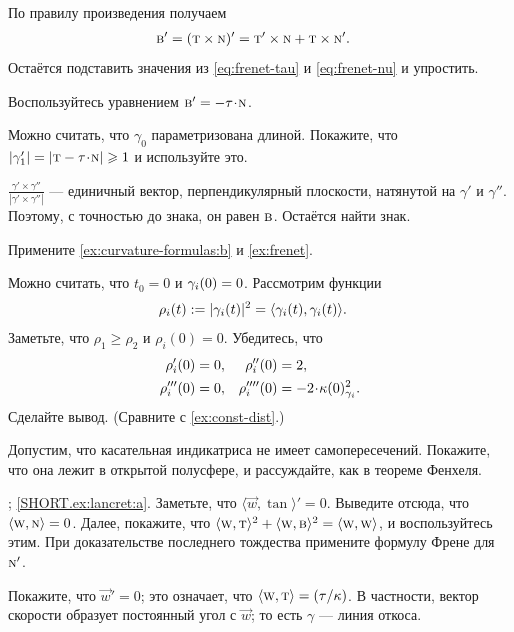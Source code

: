 По правилу произведения получаем
\begin{align*}
\text{\sc{b}}'&=(\text{\sc{t}}\times \text{\sc{n}})'=
\text{\sc{t}}'\times \text{\sc{n}}+\text{\sc{t}}\times\text{\sc{n}}'.
\end{align*}
Остаётся подставить значения из \ref{eq:frenet-tau} и \ref{eq:frenet-nu} и упростить.

Воспользуйтесь уравнением $\bi' = - \tor\cdot \norm $.

Можно считать, что $\gamma_0$ параметризована длиной.
Покажите, что
$|\gamma_1'|=|\tan-\tor\cdot \norm|\ge 1$ и используйте это.

$\tfrac{\gamma'\times\gamma''}{|\gamma'\times\gamma''|}$ --- единичный вектор, перпендикулярный плоскости, натянутой на $\gamma'$ и $\gamma''$.
Поэтому, с точностью до знака, он равен $\text{\sc{b}}$.
Остаётся найти знак.

Примените \ref{ex:curvature-formulas:b} и \ref{ex:frenet}.

Можно считать, что $t_0=0$ и $\gamma_i(0)\z=0$.
Рассмотрим функции
\begin{align*}
\rho_i(t)&\mathrel{:=}|\gamma_i(t)|^2=\langle \gamma_i(t),\gamma_i(t)\rangle.
\end{align*}
Заметьте, что $\rho_1\ge \rho_2$ и $\rho_i(0)=0$.
Убедитесь, что 
\begin{align*}
\rho_i'(0)&=0,
&
\rho_i''(0)&=2,
\\
\rho_i'''(0)&=0,
&
\rho_i''''(0)&=-2\cdot\kur(0)^2_{\gamma_i}.
\end{align*}
Сделайте вывод. (Сравните с \ref{ex:const-dist}.)

Допустим, что касательная индикатриса не имеет самопересечений.
Покажите, что она лежит в открытой полусфере, и рассуждайте, как в теореме Фенхеля.

\parbf{\ref{ex:lancret}}; \ref{SHORT.ex:lancret:a}.
Заметьте, что 
$\langle \vec w,\tan\rangle'=0$.
Выведите отсюда, что $\langle \text{\sc{w}}, \text{\sc{n}}\rangle =0$.
Далее, покажите, что $\langle \text{\sc{w}}, \text{\sc{t}}\rangle^2+\langle \text{\sc{w}}, \text{\sc{b}}\rangle^2=\langle \text{\sc{w}}, \text{\sc{w}}\rangle$, и воспользуйтесь этим.
При доказательстве последнего тождества примените формулу Френе для~$\text{\sc{n}}'$.

Покажите, что $\vec w'=0$;
это означает, что $\langle \vec w,\tan\rangle\z=\tfrac\tor\kur$.
В частности, вектор скорости образует постоянный угол с $\vec w$; то есть $\gamma$ --- линия откоса.

